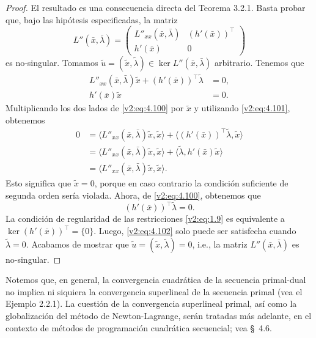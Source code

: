 \begin{proof}
    El resultado es una consecuencia directa del Teorema 3.2.1. Basta probar que, bajo las hipótesis especificadas, la matriz
    \[
        L''(\bar{x}, \bar{\lambda}) = \begin{pmatrix} L''_{xx}(\bar{x}, \bar{\lambda}) & (h'(\bar{x}))^\top \\ h'(\bar{x}) & 0 \end{pmatrix}
    \]
    es no-singular.
    Tomamos $\tilde{u} = (\tilde{x}, \tilde{\lambda}) \in \ker L''(\bar{x}, \bar{\lambda})$ arbitrario. Tenemos que
    \begin{align}
        L''_{xx}(\bar{x}, \bar{\lambda})\tilde{x} + (h'(\bar{x}))^\top \tilde{\lambda} &= 0, \label{v2:eq:4.100} \\
        h'(\bar{x})\tilde{x} &= 0. \label{v2:eq:4.101}
    \end{align}
    Multiplicando los dos lados de \eqref{v2:eq:4.100} por $\tilde{x}$ y utilizando \eqref{v2:eq:4.101}, obtenemos
    \begin{align*}
        0 &= \langle L''_{xx}(\bar{x}, \bar{\lambda})\tilde{x}, \tilde{x} \rangle + \langle (h'(\bar{x}))^\top \tilde{\lambda}, \tilde{x} \rangle \\
        &= \langle L''_{xx}(\bar{x}, \bar{\lambda})\tilde{x}, \tilde{x} \rangle + \langle \tilde{\lambda}, h'(\bar{x})\tilde{x} \rangle \\
        &= \langle L''_{xx}(\bar{x}, \bar{\lambda})\tilde{x}, \tilde{x} \rangle.
    \end{align*}
    Esto significa que $\tilde{x} = 0$, porque en caso contrario la condición suficiente de segunda orden sería violada. Ahora, de \eqref{v2:eq:4.100}, obtenemos que
    \begin{equation}
        (h'(\bar{x}))^\top \tilde{\lambda} = 0.
        \label{v2:eq:4.102}
    \end{equation}
    La condición de regularidad de las restricciones \eqref{v2:eq:1.9} es equivalente a $\ker(h'(\bar{x}))^\top = \{0\}$. Luego, \eqref{v2:eq:4.102} solo puede ser satisfecha cuando $\tilde{\lambda} = 0$. Acabamos de mostrar que $\tilde{u} = (\tilde{x}, \tilde{\lambda}) = 0$, i.e., la matriz $L''(\bar{x}, \bar{\lambda})$ es no-singular.
\end{proof}

Notemos que, en general, la convergencia cuadrática de la secuencia primal-dual no implica ni siquiera la convergencia superlineal de la secuencia primal (vea el Ejemplo 2.2.1). La cuestión de la convergencia superlineal primal, así como la globalización del método de Newton-Lagrange, serán tratadas más adelante, en el contexto de métodos de programación cuadrática secuencial; vea \S~4.6.

